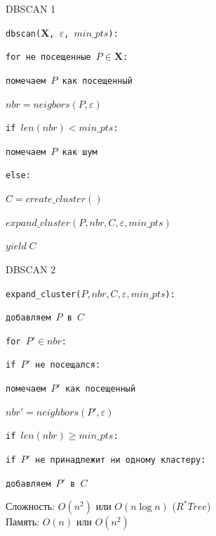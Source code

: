 \documentclass[10pt,a4paper]{beamer}
\begin{document}
\begin{frame}{DBSCAN 1}

\texttt{dbscan($\mathbf{X}$, $\varepsilon$, $min\_pts$):}

\texttt{\quad for не посещенные $P \in \mathbf{X}$:}

\texttt{\quad\quad помечаем $P$ как посещенный}

\texttt{\quad\quad $nbr = neigbors(P, \varepsilon)$}

\texttt{\quad\quad if $len(nbr) < min\_pts$:}

\texttt{\quad\quad\quad помечаем $P$ как шум}

\texttt{\quad\quad else:}

\texttt{\quad\quad\quad $C = create\_cluster()$}

\texttt{\quad\quad\quad $expand\_cluster(P, nbr, C, \varepsilon, min\_pts)$}

\texttt{\quad\quad\quad $yield\;C$}

\end{frame}


\begin{frame}{DBSCAN 2}

\texttt{expand\_cluster($P, nbr, C, \varepsilon, min\_pts$):}

\texttt{\quad добавляем $P$ в $C$}

\texttt{\quad for $P' \in nbr$:}

\texttt{\quad\quad if $P'$ не посещался:}

\texttt{\quad\quad\quad помечаем $P'$ как посещенный}

\texttt{\quad\quad\quad $nbr' = neighbors(P', \varepsilon)$}

\texttt{\quad\quad\quad if $len(nbr) \geq min\_pts$:}

\texttt{\quad\quad if $P'$ не принадлежит ни одному кластеру:}

\texttt{\quad\quad\quad добавляем $P'$ в $C$}

\vspace{1em}
Сложность: $O(n^2)$ или $O(n \log n)$ ($R^*Tree$) \\ 
Память: $O(n)$ или $O(n^2)$ 

\end{frame}

\end{document}
